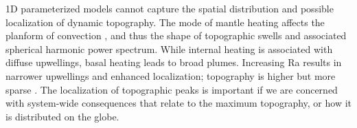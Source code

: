 1D parameterized models cannot capture the spatial distribution and possible localization of dynamic topography. The mode of mantle heating affects the planform of convection \citep[e.g.,][]{Choblet2009}, and thus the shape of topographic swells and associated spherical harmonic power spectrum. While internal heating is associated with diffuse upwellings, basal heating leads to broad plumes. Increasing Ra results in narrower upwellings and enhanced localization; topography is higher but more sparse \citep{Bunge1996}. The localization of topographic peaks is important if we are concerned with system-wide consequences that relate to the maximum topography, or how it is distributed on the globe.


